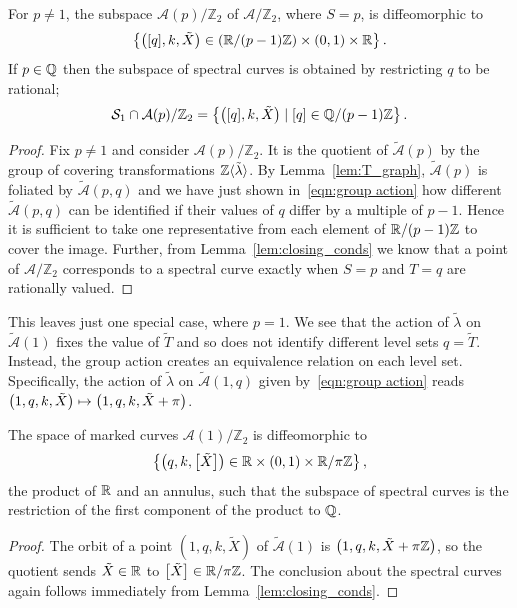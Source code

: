 \documentclass{article}
\begin{document}
\begin{thm}\label{thm:topology_curves}
For $p\neq 1$, the subspace $\mathcal{A}(p)/\mathbb{Z}_2$ of $\mathcal{A}/\mathbb{Z}_2$, where $S=p$, is diffeomorphic to
\[
\left\{ \left([q],k,\tilde{X}\right) \in \left(\mathbb{R}/ (p-1)\mathbb{Z}\right) \times (0,1) \times \mathbb{R} \right\}.
\]
If $p\in\mathbb{Q}$ then the subspace of spectral curves is obtained by restricting $q$ to be rational;
\[
\mathcal{S}_1 \cap \mathcal{A}(p)/\mathbb{Z}_2  = \left\{ \left([q],k,\tilde{X}\right) \mid [q] \in \mathbb{Q}/ (p-1)\mathbb{Z} \right\}.
\]
\begin{proof}
Fix $p\neq 1$ and consider $\mathcal{A}(p)/\mathbb{Z}_2$. It is the quotient of $\mathcal{\tilde{A}}(p)$ by the group of covering transformations $\mathbb{Z}\langle\tilde{\lambda}\rangle$. By Lemma~\ref{lem:T_graph}, $\mathcal{\tilde{A}}(p)$ is foliated by $\mathcal{\tilde{A}}(p,q)$ and we have just shown in~\eqref{eqn:group action} how different $\mathcal{\tilde{A}}(p,q)$ can be identified if their values of $q$ differ by a multiple of $p-1$. Hence it is sufficient to take one representative from each element of $\mathbb{R}/(p-1)\mathbb{Z}$ to cover the image.
Further, from Lemma~\ref{lem:closing_conds} we know that a point of $\mathcal{A}/\mathbb{Z}_2$ corresponds to a spectral curve exactly when $S=p$ and $T=q$ are rationally valued.
\end{proof}
\end{thm}

This leaves just one special case, where $p=1$. We see that the action of $\tilde{\lambda}$ on $\mathcal{\tilde{A}}(1)$ fixes the value of $\tilde{T}$ and so does not identify different level sets $q=\tilde{T}$. Instead, the group action creates an equivalence relation on each level set. Specifically, the action of $\tilde{\lambda}$ on $\mathcal{\tilde{A}}(1,q)$ given by~\eqref{eqn:group action} reads $\left(1,q,k,\tilde{X}\right) \mapsto \left(1, q, k, \tilde{X} + \pi\right)$.

\begin{thm}\label{thm:topology_curves_p1}
The space of marked curves $\mathcal{A}(1)/\mathbb{Z}_2$ is diffeomorphic to
\[
\left\{ \left(q,k,\left[\tilde{X}\right]\right) \in \mathbb{R} \times (0,1) \times \mathbb{R}/\pi\mathbb{Z} \right\},
\]
the product of $\mathbb{R}$ and an annulus, such that the subspace of spectral curves is the restriction of the first component of the product to $\mathbb{Q}$.

\begin{proof}
The orbit of a point $(1,q,k,\tilde{X})$ of $\mathcal{\tilde{A}}(1)$ is $\left(1,q,k,\tilde{X}+\pi\mathbb{Z}\right)$,
so the quotient sends $\tilde{X} \in \mathbb{R}$ to $\left[\tilde{X}\right] \in \mathbb{R}/\pi\mathbb{Z}$. The conclusion about the spectral curves again follows immediately from Lemma~\ref{lem:closing_conds}.
\end{proof}
\end{thm}
\end{document}
